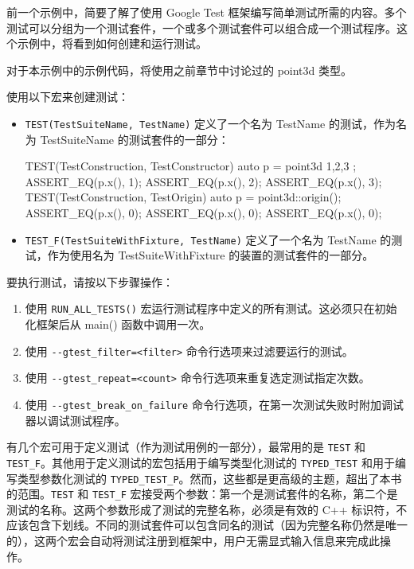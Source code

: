 
前一个示例中，简要了解了使用 Google Test 框架编写简单测试所需的内容。多个测试可以分组为一个测试套件，一个或多个测试套件可以组合成一个测试程序。这个示例中，将看到如何创建和运行测试。


对于本示例中的示例代码，将使用之前章节中讨论过的 point3d 类型。


使用以下宏来创建测试：

\begin{itemize}
\item
\verb|TEST(TestSuiteName, TestName)| 定义了一个名为 TestName 的测试，作为名为 TestSuiteName 的测试套件的一部分：

\begin{cpp}
TEST(TestConstruction, TestConstructor)
{
    auto p = point3d{ 1,2,3 };
    ASSERT_EQ(p.x(), 1);
    ASSERT_EQ(p.x(), 2);
    ASSERT_EQ(p.x(), 3);
}
TEST(TestConstruction, TestOrigin)
{
    auto p = point3d::origin();
    ASSERT_EQ(p.x(), 0);
    ASSERT_EQ(p.x(), 0);
    ASSERT_EQ(p.x(), 0);
}
\end{cpp}

\item
\verb|TEST_F(TestSuiteWithFixture, TestName)| 定义了一个名为 TestName 的测试，作为使用名为 TestSuiteWithFixture 的装置的测试套件的一部分。
\end{itemize}

要执行测试，请按以下步骤操作：

\begin{enumerate}
\item
使用 \verb|RUN_ALL_TESTS()| 宏运行测试程序中定义的所有测试。这必须只在初始化框架后从 main() 函数中调用一次。

\item
使用 \verb|--gtest_filter=<filter>| 命令行选项来过滤要运行的测试。

\item
使用 \verb|--gtest_repeat=<count>| 命令行选项来重复选定测试指定次数。

\item
使用 \verb|--gtest_break_on_failure| 命令行选项，在第一次测试失败时附加调试器以调试测试程序。
\end{enumerate}


有几个宏可用于定义测试（作为测试用例的一部分），最常用的是 \verb|TEST| 和 \verb|TEST_F|。其他用于定义测试的宏包括用于编写类型化测试的 \verb|TYPED_TEST| 和用于编写类型参数化测试的 \verb|TYPED_TEST_P|。然而，这些都是更高级的主题，超出了本书的范围。\verb|TEST| 和 \verb|TEST_F| 宏接受两个参数：第一个是测试套件的名称，第二个是测试的名称。这两个参数形成了测试的完整名称，必须是有效的 C++ 标识符，不应该包含下划线。不同的测试套件可以包含同名的测试（因为完整名称仍然是唯一的），这两个宏会自动将测试注册到框架中，用户无需显式输入信息来完成此操作。

